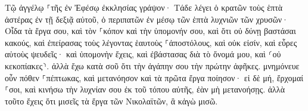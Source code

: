 \documentclass{openreader}
\begin{document}
Τῷ ἀγγέλῳ ⸀τῆς ἐν Ἐφέσῳ ἐκκλησίας γράψον· Τάδε λέγει ὁ κρατῶν τοὺς ἑπτὰ ἀστέρας ἐν τῇ δεξιᾷ αὐτοῦ, ὁ περιπατῶν ἐν μέσῳ τῶν ἑπτὰ λυχνιῶν τῶν χρυσῶν· 
Οἶδα τὰ ἔργα σου, καὶ τὸν ⸀κόπον καὶ τὴν ὑπομονήν σου, καὶ ὅτι οὐ δύνῃ βαστάσαι κακούς, καὶ ἐπείρασας τοὺς λέγοντας ἑαυτοὺς ⸀ἀποστόλους, καὶ οὐκ εἰσίν, καὶ εὗρες αὐτοὺς ψευδεῖς· 
καὶ ὑπομονὴν ἔχεις, καὶ ἐβάστασας διὰ τὸ ὄνομά μου, καὶ ⸂οὐ κεκοπίακες⸃. 
ἀλλὰ ἔχω κατὰ σοῦ ὅτι τὴν ἀγάπην σου τὴν πρώτην ἀφῆκες. 
μνημόνευε οὖν πόθεν ⸀πέπτωκας, καὶ μετανόησον καὶ τὰ πρῶτα ἔργα ποίησον· εἰ δὲ μή, ἔρχομαί ⸀σοι, καὶ κινήσω τὴν λυχνίαν σου ἐκ τοῦ τόπου αὐτῆς, ἐὰν μὴ μετανοήσῃς. 
ἀλλὰ τοῦτο ἔχεις ὅτι μισεῖς τὰ ἔργα τῶν Νικολαϊτῶν, ἃ κἀγὼ μισῶ. 
\end{document}
